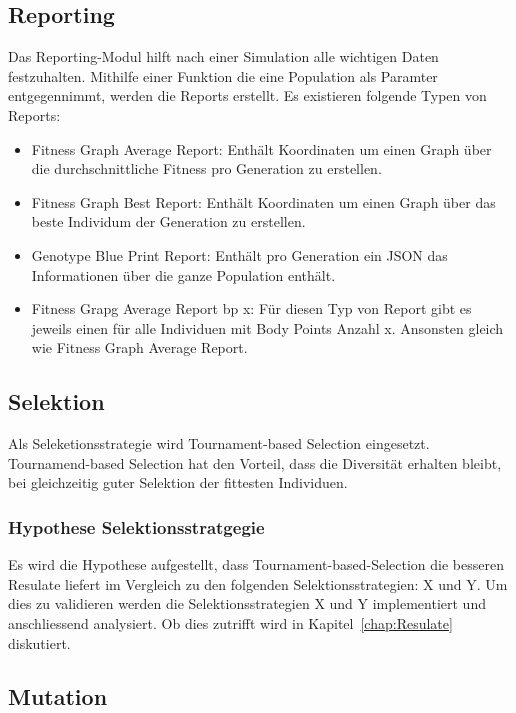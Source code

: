     \subsection{Reporting}
    \label{subsec:Reporting}
      Das Reporting-Modul hilft nach einer Simulation alle wichtigen Daten festzuhalten. Mithilfe einer Funktion die eine Population als Paramter entgegennimmt,
      werden die Reports erstellt. Es existieren folgende Typen von Reports:
      \begin{itemize}
        \item Fitness Graph Average Report: Enthält Koordinaten um einen Graph über die durchschnittliche Fitness pro Generation zu erstellen.
        \item Fitness Graph Best Report: Enthält Koordinaten um einen Graph über das beste Individum der Generation zu erstellen.
        \item Genotype Blue Print Report: Enthält pro Generation ein JSON das Informationen über die ganze Population enthält.
        \item Fitness Grapg Average Report bp x: Für diesen Typ von Report gibt es jeweils einen für alle Individuen mit Body Points Anzahl x.
        Ansonsten gleich wie Fitness Graph Average Report.
      \end{itemize}


    \subsection{Selektion\label{sec:Selektion}}

      Als Seleketionsstrategie wird Tournament-based Selection eingesetzt. Tournamend-based Selection hat den Vorteil,
      dass die Diversität erhalten bleibt, bei gleichzeitig guter Selektion der fittesten Individuen.

      \subsubsection{Hypothese Selektionsstratgegie\label{sub:Hypothese Selektionsstratgegie}}

        Es wird die Hypothese aufgestellt, dass Tournament-based-Selection die besseren Resulate liefert im Vergleich zu den folgenden Selektionsstrategien: X und Y.
        Um dies zu validieren werden die Selektionsstrategien X und Y implementiert und anschliessend analysiert.
        Ob dies zutrifft wird in Kapitel~\ref{chap:Resulate} diskutiert.

    \subsection{Mutation\label{sec:Mutation}}

